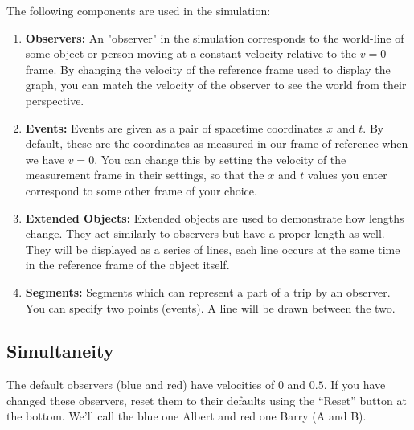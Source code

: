 \documentclass{article}
\begin{document}
The following components are used in the simulation:
\begin{enumerate}
\item \textbf{Observers:} An "observer" in the simulation corresponds to the world-line of some object or person moving at a constant velocity relative to the $v=0$ frame. By changing the velocity of the reference frame used to display the graph, you can match the velocity of the observer to see the world from their perspective.

\item \textbf{Events:} Events are given as a pair of spacetime coordinates $x$ and $t$. By default, these are the coordinates as measured in our frame of reference when we have $v=0$. You can change this by setting the velocity of the measurement frame in their settings, so that the $x$ and $t$ values you enter correspond to some other frame of your choice.

\item \textbf{Extended Objects:} Extended objects are used to demonstrate how lengths change. They act similarly to observers but have a proper length as well. They will be displayed as a series of lines, each line occurs at the same time in the reference frame of the object itself.

\item \textbf{Segments:} Segments which can represent a part of a trip by an observer. You can specify two points (events). A line will be drawn between the two.
\end{enumerate}

\clearpage

\subsection*{Simultaneity}

The default observers (blue and red) have velocities of 0 and $0.5$. If you have changed these observers, reset them to their defaults using the ``Reset'' button at the bottom. We'll call the blue one Albert and red one Barry (A and B).
\end{document}
